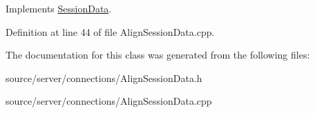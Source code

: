 Implements \hyperlink{class_session_data_ad05a594d8410d638f1a066bfa5a10ba3}{Session\-Data}.



Definition at line 44 of file Align\-Session\-Data.\-cpp.



The documentation for this class was generated from the following files\-:\begin{DoxyCompactItemize}
\item 
source/server/connections/Align\-Session\-Data.\-h\item 
source/server/connections/Align\-Session\-Data.\-cpp\end{DoxyCompactItemize}
